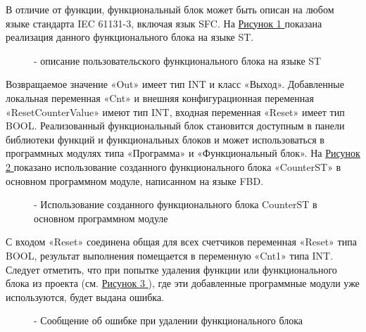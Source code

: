 \documentclass[letterpaper,10pt,russian]{sphinxmanual}
\begin{document}
В отличие от функции, функциональный блок может быть описан на любом
языке стандарта IEC 61131-3, включая язык SFC. На \hyperref[usage_guide/work_with_project:image160]{Рисунок \ref{usage_guide/work_with_project:image160} } показана
реализация данного функционального блока на языке ST.
\begin{figure}[htbp]
\centering
\capstart

\noindent{}
\caption{- описание пользовательского функционального блока на языке ST}\label{usage_guide/work_with_project:image160}\end{figure}

Возвращаемое значение «Out» имеет тип INT и класс «Выход». Добавленные
локальная переменная «Cnt» и внешняя конфигурационная переменная
«ResetCounterValue» имеют тип INT, входная переменная «Reset» имеет тип
BOOL. Реализованный функциональный блок становится доступным в панели
библиотеки функций и функциональных блоков и может
использоваться в программных модулях типа «Программа» и «Функциональный
блок». На \hyperref[usage_guide/work_with_project:image161]{Рисунок \ref{usage_guide/work_with_project:image161} } показано использование созданного функционального
блока «CounterST» в основном программном модуле, написанном на языке
FBD.
\begin{figure}[htbp]
\centering
\capstart

\noindent{}
\caption{- Использование созданного функционального блока CounterST в основном программном модуле}\label{usage_guide/work_with_project:image161}\end{figure}

С входом «Reset» соединена общая для всех счетчиков переменная «Reset»
типа BOOL, результат выполнения помещается в переменную «Cnt1» типа INT.
Следует отметить, что при попытке удаления функции или функционального
блока из проекта (см. \hyperref[usage_guide/work_with_project:image162]{Рисунок \ref{usage_guide/work_with_project:image162} }), где эти добавленные программные модули
уже используются, будет выдана ошибка.
\begin{figure}[htbp]
\centering
\capstart

\noindent{}
\caption{- Сообщение об ошибке при удалении функционального блока}\label{usage_guide/work_with_project:image162}\end{figure}
\end{document}
